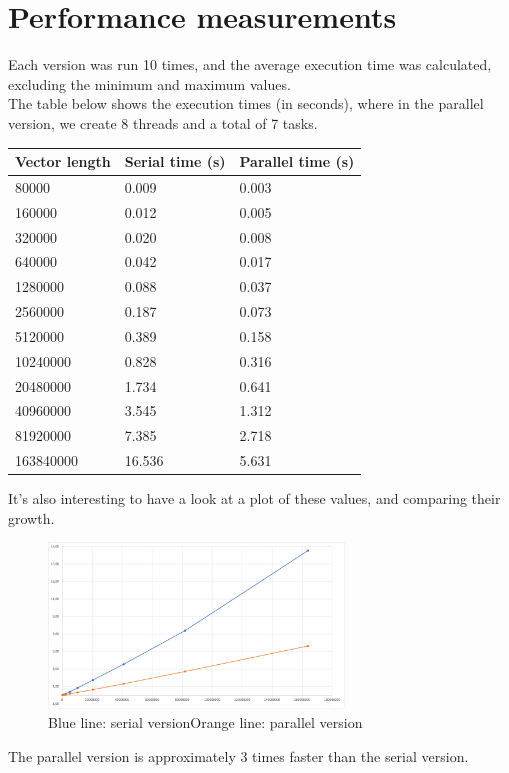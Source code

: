 \documentclass[a4paper, 11pt]{article}
\begin{document}
\section{Performance measurements}
Each version was run 10 times, and the average execution time was calculated, excluding the minimum and maximum values.\\
The table below shows the execution times (in seconds), where in the parallel version, we create 8 threads and a total of 7 tasks.
\begin{table}[H]
    \centering
    \begin{tabular}{|l|l|l|}
    \hline
    Vector length & Serial time (s) & Parallel time (s) \\ \hline
    80000         & 0.009           & 0.003             \\ \hline
    160000        & 0.012           & 0.005             \\ \hline
    320000        & 0.020           & 0.008             \\ \hline
    640000        & 0.042           & 0.017             \\ \hline
    1280000       & 0.088           & 0.037             \\ \hline
    2560000       & 0.187           & 0.073             \\ \hline
    5120000       & 0.389           & 0.158             \\ \hline
    10240000      & 0.828           & 0.316             \\ \hline
    20480000      & 1.734           & 0.641             \\ \hline
    40960000      & 3.545           & 1.312             \\ \hline
    81920000      & 7.385           & 2.718             \\ \hline
    163840000     & 16.536          & 5.631             \\ \hline
    \end{tabular}
    \end{table}
    \pagebreak
It's also interesting to have a look at a plot of these values, and comparing their growth.
\begin{figure}[H]
    \centering
    \includegraphics[width=0.7\textwidth]{svp}
    \caption{Blue line: serial version\qquad Orange line: parallel version}
\end{figure}
The parallel version is approximately 3 times faster than the serial version.
\end{document}
